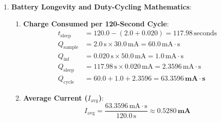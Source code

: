 \begin{enumerate}
\begin{enumerate}
        \item \textbf{Window Mean Squared Error ($e$)}:
        \begin{equation*}
        e = \frac{\text{SSE}}{W} = \frac{0.1000}{4} = \mathbf{0.0250\,\text{g}^2}
        \end{equation*}

        \item \textbf{Statistical $3\sigma$ Threshold ($\tau$)}:
        \begin{equation*}
        \tau = \mu_{\text{train}} + 3 \cdot \sigma_{\text{train}} = 0.0120 + 3(0.0040) = 0.0120 + 0.0120 = \mathbf{0.0240\,\text{g}^2}
        \end{equation*}

        \item \textbf{Diagnostic Decision}:
        \begin{equation*}
        e = 0.0250\,\text{g}^2 > \tau = 0.0240\,\text{g}^2
        \end{equation*}
        Because the reconstruction error exceeds the $3\sigma$ threshold, the window is classified as an \textbf{ANOMALY}.
    \end{enumerate}

    \item \textbf{Battery Longevity and Duty-Cycling Mathematics}:
    \begin{enumerate}
        \item \textbf{Charge Consumed per 120-Second Cycle}:
        \begin{align*}
        t_{\text{sleep}} &= 120.0 - (2.0 + 0.020) = 117.98\,\text{seconds} \\
        Q_{\text{sample}} &= 2.0\,\text{s} \times 30.0\,\text{mA} = 60.0\,\text{mA}\cdot\text{s} \\
        Q_{\text{inf}} &= 0.020\,\text{s} \times 50.0\,\text{mA} = 1.0\,\text{mA}\cdot\text{s} \\
        Q_{\text{sleep}} &= 117.98\,\text{s} \times 0.020\,\text{mA} = 2.3596\,\text{mA}\cdot\text{s} \\
        Q_{\text{cycle}} &= 60.0 + 1.0 + 2.3596 = \mathbf{63.3596\,\text{mA}\cdot\text{s}}
        \end{align*}

        \item \textbf{Average Current ($I_{\text{avg}}$)}:
        \begin{equation*}
        I_{\text{avg}} = \frac{63.3596\,\text{mA}\cdot\text{s}}{120.0\,\text{s}} \approx \mathbf{0.5280\,\text{mA}}
        \end{equation*}


\end{enumerate}
\end{enumerate}
